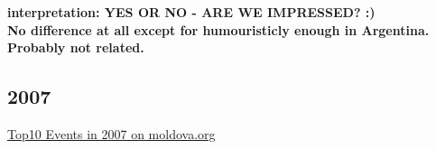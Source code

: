 \documentclass[11pt,a4paper,english]{article}
\begin{document}
\begin{itemize}
\begin{figure}[H]
\begin{center}
							\end{center}
							\vspace{-13pt}
						\end{figure}		
						\bf interpretation: \rm YES OR NO - ARE WE IMPRESSED? :)
						\\ No difference at all except for humouristicly enough in Argentina. Probably not related.
						
						
							
				\end{itemize}
			
			\subsection{2007}
			\href{http://social.moldova.org/news/10-most-important-world-events-of-2007-217388-eng.html}{Top10 Events in 2007 on moldova.org}
\end{document}
